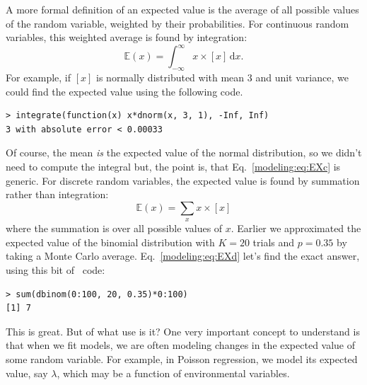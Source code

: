 A more formal definition of an expected value is the average of all
possible values of the random variable, weighted by their
probabilities. For continuous random variables, this weighted average
is found by integration: %
\begin{equation}
  \mathbb{E}(x) = \int_{-\infty}^{\infty} x \times [x] \, \text{d}{x}.
  \label{modeling:eq:EXc}
\end{equation}
For example, if $[x]$ is normally distributed with mean 3 and unit
variance, we could find the expected value using the following code.
\begin{verbatim}
> integrate(function(x) x*dnorm(x, 3, 1), -Inf, Inf)
3 with absolute error < 0.00033
\end{verbatim}
Of course, the mean \textit{is} the expected value of the normal
distribution, so we didn't need to compute the integral but, the
point is, that Eq.~\ref{modeling:eq:EXc} is generic. For discrete
random variables, the expected value is found by summation rather than
integration: %
\begin{equation}
  \mathbb{E}(x) = \sum_{x} x \times [x]
  \label{modeling:eq:EXd}
\end{equation}
where the summation is over all possible values of $x$.
Earlier we
approximated the expected value of the binomial distribution
with $K=20$ trials and $p=0.35$ by taking a Monte Carlo
average. Eq.~\ref{modeling:eq:EXd} let's
find the exact answer,  using this bit of \R~code:
\begin{verbatim}
> sum(dbinom(0:100, 20, 0.35)*0:100)
[1] 7
\end{verbatim}
This is great. But of what use is it? One very
important concept to understand is that when we fit
models, we are often modeling changes in the expected value of some random
variable. For example, in Poisson regression, we model its expected
value, say $\lambda$,
which may be a function
of environmental variables.

